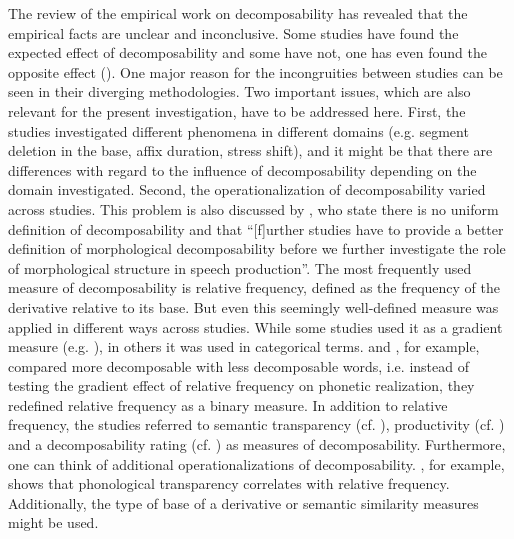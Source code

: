 {%
The review of the empirical work on decomposability has revealed that the empirical facts are unclear and inconclusive. Some studies have found the expected effect of decomposability and some have not, one has even found the opposite effect (\citealt{Schuppler.2012}). 
One major reason for the incongruities between studies can be seen in their diverging methodologies. Two important issues, which are also relevant for the present investigation, have to be addressed  here. 
First, the studies investigated different phenomena in different domains (e.g. segment deletion in the base, affix duration, stress shift), and it might be that there are differences with regard to the influence of decomposability depending on the domain investigated. 
Second, the operationalization of decomposability varied across studies. This problem is also discussed by \citet[16]{Hanique.2012}, who state there is no uniform definition of decomposability and that ``[f]urther studies have to provide a better definition of morphological decomposability before we further investigate the role of morphological structure in speech production''. 
The most frequently used measure of decomposability is relative frequency, defined as the frequency of the derivative relative to its base. But even this seemingly well-defined measure was applied in different ways across studies. While some studies used it as a gradient measure (e.g. \citealt{Hanique.2011,Schuppler.2012}), in others it was used in categorical terms. \cite{Hay.2001} and \cite{Collie.2008}, for example, compared more decomposable with less decomposable words, i.e. instead of testing the gradient effect of relative frequency on phonetic realization, they redefined relative frequency as a binary measure. In addition to relative frequency,  the studies referred to semantic transparency (cf. \citealt{Schuppler.2012}), productivity (cf. \citealt{Hay.2007}) and a decomposability rating (cf. \citealt{Burki.2011}) as measures of decomposability. Furthermore, one can think of additional operationalizations of decomposability. \cite{Hay.2003}, for example, shows that phonological transparency correlates with relative frequency. Additionally, the type of base of a derivative or semantic similarity measures might be used.  

}
